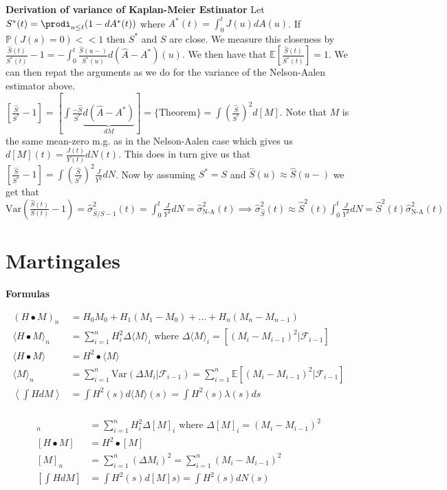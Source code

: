 \documentclass{article}
\begin{document}
\medskip

\textbf{Derivation of variance of Kaplan-Meier Estimator} 
Let $S^*(t) = \prodi_{u\leq t} (1-dA^*(t))$ where $A^*(t) = \int_0^t J(u)dA(u)$. If $\mathbb{P}(J(s) = 0) << 1$ then $S^*$ and $S$ are close. We measure this closeness by $\frac{\hat{S}(t)}{S^*(t)} - 1 = -\int_0^t \frac{\hat{S}(u-)}{S^*(u)}d(\hat{A} - A^*)(u)$. We then have that $\mathbb{E}\left[\frac{\hat{S}(t)}{S^*(t)}\right] = 1$. We can then repat the arguments as we do for the variance of the Nelson-Aalen estimator above. $\left[\frac{\hat{S}}{S^*} - 1\right] = \left[\int \frac{-\hat{S}}{S^*}\underbrace{d(\hat{A} - A^*)}_{dM}\right] = \{\text{Theorem}\} = \int \left(\frac{\hat{S}}{S^*}\right)^2d[M]$. Note that $M$ is the same mean-zero m.g. as in the Nelson-Aalen case which gives us $d[M](t)=\frac{J(t)}{Y(t)}dN(t)$. This does in turn give us that $\left[\frac{\hat{S}}{S^*}-1\right] = \int \left(\frac{\hat{S}}{S^*}\right)^2 \frac{J}{Y^2}dN$. Now by assuming $S^* = S$ and $\hat{S}(u) \approx \hat{S}(u-)$ we get that $\text{Var}\left(\frac{\hat{S}(t)}{S(t)} - 1\right) = \hat\sigma^2_{\hat{S}/S- 1}(t) = \int_0^t \frac{J}{Y^2}dN = \hat\sigma^2_{\text{N-A}}(t) \implies \hat\sigma^2_{\hat{S}}(t) \approx \hat{S}^2(t)\int_0^t \frac{J}{Y^2}dN = \hat{S}^2(t)\hat\sigma^2_{\text{N-A}}(t)$

\newpage

\section*{Martingales}

\textbf{Formulas} 

\begin{minipage}{0.5\textwidth}
	\begin{align*}
		(H\bullet M)_n &= H_0M_0 + H_1(M_1-M_0) + \hdots + H_n(M_n-M_{n-1}) \\
		\langle H\bullet M \rangle_n &= \sum_{i=1}^n H_i^2\Delta\langle M\rangle_i \text{ where }\Delta \langle M\rangle_i = [(M_i - M_{i-1})^2|\mathcal{F}_{i-1}]\\
		\langle H\bullet M\rangle &= H^2\bullet \langle M\rangle \\
		\langle M \rangle_n &= \sum_{i=1}^n \text{Var}(\Delta M_i| \mathcal{F}_{i-1}) = \sum_{i=1}^n \mathbb{E}[(M_i - M_{i-1})^2|\mathcal{F}_{i-1}] \\
		\left\langle \int HdM\right\rangle &= \int H^2(s)d\langle M\rangle(s) = \int H^2(s) \lambda(s)ds \\
	\end{align*}
\end{minipage}
\begin{minipage}{0.5\textwidth}
	\begin{align*}
		[H\bullet M]_n &= \sum_{i=1}^n H_i^2\Delta[M]_i \text{ where }\Delta [M]_i = (M_i - M_{i-1})^2\\
		[H\bullet M] &= H^2\bullet[M] \\
		[M]_n &= \sum_{i=1}^n (\Delta M_i)^2 = \sum_{i=1}^n (M_i -M_{i-1})^2 \\
		\left[ \int HdM\right] &= \int H^2(s)d[ M]s) = \int H^2(s) dN(s)
	\end{align*}
\end{minipage}
\end{document}
